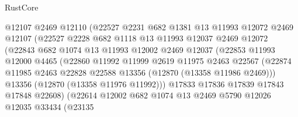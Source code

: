 \begin{lexlean}{RustCore}
\begin{coremodule}
                          @12107
                          @2469
                          @12110
                          (@22527
                            @2231
                            @682
                            @1381
                            @13
                            @11993
                            @12072
                            @2469
                            @12107
                            (@22527
                              @2228
                              @682
                              @1118
                              @13
                              @11993
                              @12037
                              @2469
                              @12072
                              (@22843
                                @682
                                @1074
                                @13
                                @11993
                                @12002
                                @2469
                                @12037
                                (@22853
                                  @11993
                                  @12000
                                  @4465
                                  (@22860
                                    @11992
                                    @11999
                                    @2619
                                    @11975
                                    @2463
                                    @22567
                                    (@22874
                                      @11985
                                      @2463
                                      @22828
                                      @22588
                                      @13356
                                      (@12870 (@13358 @11986 @2469)))
                                    @13356
                                    (@12870 (@13358 @11976 @11992)))
                                  @17833
                                  @17836
                                  @17839
                                  @17843
                                  @17848
                                  @22608)
                                (@22614
                                  @12002
                                  @682
                                  @1074
                                  @13
                                  @2469
                                  @5790
                                  @12026
                                  @12035
                                  @33434
                                  (@23135

\end{coremodule}
\end{lexlean}
